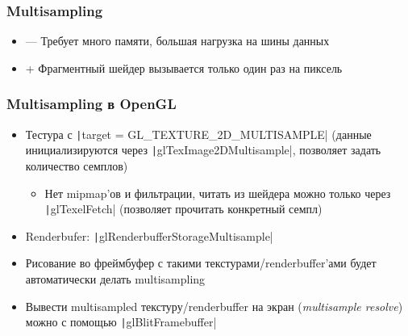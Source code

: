 \documentclass[10pt]{beamer}
\begin{document}
\begin{frame}[fragile]
\frametitle{Multisampling}
\begin{itemize}
\item {\color{red}—} Требует много памяти, большая нагрузка на шины данных
\item {\color{green}+} Фрагментный шейдер вызывается только один раз на пиксель
\end{itemize}
\end{frame}

\begin{frame}[fragile]
\frametitle{Multisampling в OpenGL}
\begin{itemize}
\item Тестура с \texttt|target = GL_TEXTURE_2D_MULTISAMPLE| (данные инициализируются через \texttt|glTexImage2DMultisample|, позволяет задать количество семплов)
\pause
\begin{itemize}
\item Нет mipmap'ов и фильтрации, читать из шейдера можно только через \texttt|glTexelFetch| (позволяет прочитать конкретный семпл)
\end{itemize}
\pause
\item Renderbufer: \texttt|glRenderbufferStorageMultisample|
\pause
\item Рисование во фреймбуфер с такими текстурами/renderbuffer'ами будет автоматически делать multisampling
\pause
\item Вывести multisampled текстуру/renderbuffer на экран (\textit{multisample resolve}) можно с помощью \texttt|glBlitFramebuffer|
\end{itemize}
\end{frame}
\end{document}
